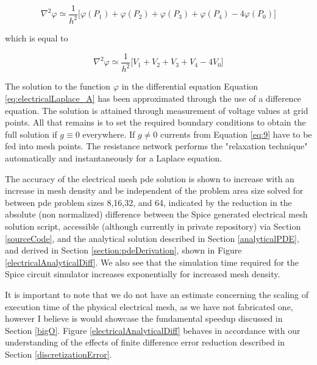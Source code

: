 \begin{equation}\label{eq:electricalDifferenceLaplace}
  \nabla^2 \varphi \simeq \frac{1}{h^2} \Big[ 
  \varphi\left(P_1\right) + 
  \varphi\left(P_2\right) + 
  \varphi\left(P_3\right) + 
  \varphi\left(P_4\right) -
  4\varphi\left(P_0\right)
  \Big]
\end{equation}

which is equal to

\begin{equation}\label{eq:voltageSolutionDifferenceLaplace}
  \nabla^2 \varphi \simeq \frac{1}{h^2} \Big[ V_1 + V_2 + V_3 + V_4 - 4V_0 \Big]
\end{equation}

\par The solution to the function $\varphi$ in the differential equation Equation  \ref{eq:electricalLaplace_A} has been approximated through the use of a difference equation. The solution is attained through measurement of voltage values at grid points. All that remains is to set the required boundary conditions to obtain the full solution if $g \equiv 0$ everywhere. If $g \neq 0$ currents from Equation \ref{eq:9} have to be fed into mesh points. The resistance network performs the "relaxation technique" automatically and instantaneously for a Laplace equation.

\par The accuracy of the electrical mesh pde solution is shown to increase with an increase in mesh density and be independent of the problem area size solved for between pde problem sizes 8,16,32, and 64, indicated by the reduction in the absolute (non normalized) difference between the \gls{Spice} generated electrical mesh solution script, accessible (although currently in private repository) via Section \ref{sourceCode}, and the analytical solution described in Section \ref{analyticalPDE}, and derived in Section \ref{section:pdeDerivation}, shown in Figure \ref{electricalAnalyticalDiff}. We also see that the simulation time required for the Spice circuit simulator increases exponentially for increased mesh density.

\par It is important to note that we do not have an estimate concerning the scaling of execution time of the physical electrical mesh, as we have not fabricated one, however I believe is would showcase the fundamental speedup discussed in Section \ref{bigO}. Figure \ref{electricalAnalyticalDiff} behaves in accordance with our understanding of the effects of finite difference error reduction described in Section \ref{discretizationError}.

